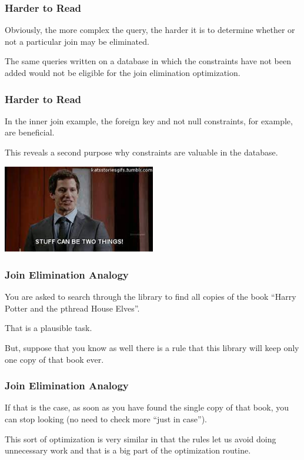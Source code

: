 \begin{frame}
\frametitle{Harder to Read}
Obviously, the more complex the query, the harder it is to determine whether or not a particular join may be eliminated. 

The same queries written on a database in which the constraints have not been added would not be eligible for the join elimination optimization. 

\end{frame}

\begin{frame}
\frametitle{Harder to Read}

In the inner join example, the foreign key and not null constraints, for example, are beneficial. 

This reveals a second purpose why constraints are valuable in the database.

\begin{center}
	\includegraphics[width=0.5\textwidth]{images/twothings.jpg}
\end{center}

\end{frame}

\begin{frame}
\frametitle{Join Elimination Analogy}
You are asked to search through the library to find all copies of the book ``Harry Potter and the pthread House Elves''. 

That is a plausible task. 

But, suppose that you know as well there is a rule that this library will keep only one copy of that book ever. 

\end{frame}

\begin{frame}
\frametitle{Join Elimination Analogy}

If that is the case, as soon as you have found the single copy of that book, you can stop looking (no need to check more ``just in case''). 

This sort of optimization is very similar in that the rules let us avoid doing unnecessary work and that is a big part of the optimization routine.

\end{frame}


